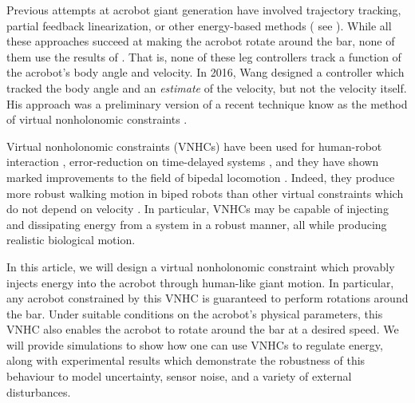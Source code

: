 \documentclass[journal,twoside,web, onecolumn, draftcls]{ieeecolor}
\begin{document}
Previous attempts at acrobot giant generation have involved
trajectory tracking, partial feedback linearization, or other energy-based
methods
( see
\cite{energy_pumping_robotic_swinging,swingup_giant_acrobot,dynamical_servo_acrobot_vc,control_giant_two_link_gymnastic_robot}
).
While all these approaches succeed at making the acrobot rotate around the
bar, none of them use the results of \cite{pendulum_length_giant_gymnastics}.
That is, none of these leg controllers track a function of the acrobot's body
angle and velocity.
In 2016, Wang designed a controller \cite{xingbo_thesis} which tracked the
body angle and an \textit{estimate} of the velocity, but not the velocity itself.
His approach was a preliminary version of a recent technique know as the method
of virtual nonholonomic constraints \cite{hybrid_zero_dynamics_bipedal_nhvcs}.

Virtual nonholonomic constraints (VNHCs) have been used for human-robot interaction
\cite{vnhc_human_robot_cooperation,psd_based_vnhc_redundant_manipulator,haptic_vnhc},
error-reduction on time-delayed systems \cite{vnhc_time_delay_teleop},
and they have shown marked improvements to the field of bipedal locomotion 
\cite{nhvc_dynamic_walking,
hybrid_zero_dynamics_bipedal_nhvcs,output_nhvc_bipedal_control}.
Indeed, they produce more robust walking motion in biped robots than
other virtual constraints which do not depend on velocity
\cite{nhvc_incline_walking}.
In particular, VNHCs may be capable of injecting and
dissipating energy from a system in a robust manner, all while producing
realistic biological motion. 

In this article, we will design a virtual nonholonomic constraint which provably
injects energy into the acrobot through human-like giant motion.
In particular, any acrobot constrained by this VNHC is guaranteed to perform
rotations around the bar.
Under suitable conditions on the acrobot's physical parameters, this VNHC
also enables the acrobot to rotate around the bar at a desired speed.
We will provide simulations to show how one can use VNHCs to regulate energy,
along with experimental results which demonstrate the robustness of this
behaviour to model uncertainty, sensor noise, and a variety of external
disturbances. 
\end{document}
